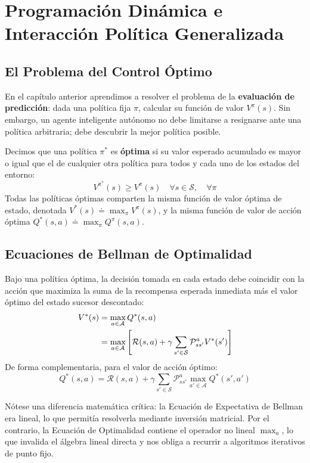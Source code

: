 \chapter{Programación Dinámica e Interacción Política Generalizada}
\label{cap:dp}

\section{El Problema del Control Óptimo}
En el capítulo anterior aprendimos a resolver el problema de la \textbf{evaluación de predicción}: dada una política fija $\pi$, calcular su función de valor $V^\pi(s)$. Sin embargo, un agente inteligente autónomo no debe limitarse a resignarse ante una política arbitraria; debe descubrir la mejor política posible.

Decimos que una política $\pi^*$ es \textbf{óptima} si su valor esperado acumulado es mayor o igual que el de cualquier otra política para todos y cada uno de los estados del entorno:
\begin{equation}
  V^{\pi^*}(s) \ge V^\pi(s) \quad \forall s \in \mathcal{S}, \quad \forall \pi
\end{equation}
Todas las políticas óptimas comparten la misma función de valor óptima de estado, denotada $V^*(s) \doteq \max_\pi V^\pi(s)$, y la misma función de valor de acción óptima $Q^*(s,a) \doteq \max_\pi Q^\pi(s,a)$.

\section{Ecuaciones de Bellman de Optimalidad}
Bajo una política óptima, la decisión tomada en cada estado debe coincidir con la acción que maximiza la suma de la recompensa esperada inmediata más el valor óptimo del estado sucesor descontado:
\begin{align}
  V^*(s) &= \max_{a \in \mathcal{A}} Q^*(s, a) \notag \\
  &= \max_{a \in \mathcal{A}} \left[ \mathcal{R}(s, a) + \gamma \sum_{s' \in \mathcal{S}} \mathcal{P}_{ss'}^a V^*(s') \right]
\end{align}
De forma complementaria, para el valor de acción óptimo:
\begin{equation}
  Q^*(s, a) = \mathcal{R}(s, a) + \gamma \sum_{s' \in \mathcal{S}} \mathcal{P}_{ss'}^a \max_{a' \in \mathcal{A}} Q^*(s', a')
\end{equation}

\begin{ideaclave}
Nótese una diferencia matemática crítica: la Ecuación de Expectativa de Bellman era lineal, lo que permitía resolverla mediante inversión matricial. Por el contrario, la Ecuación de Optimalidad contiene el operador no lineal $\max_{a}$, lo que invalida el álgebra lineal directa y nos obliga a recurrir a algoritmos iterativos de punto fijo.
\end{ideaclave}

